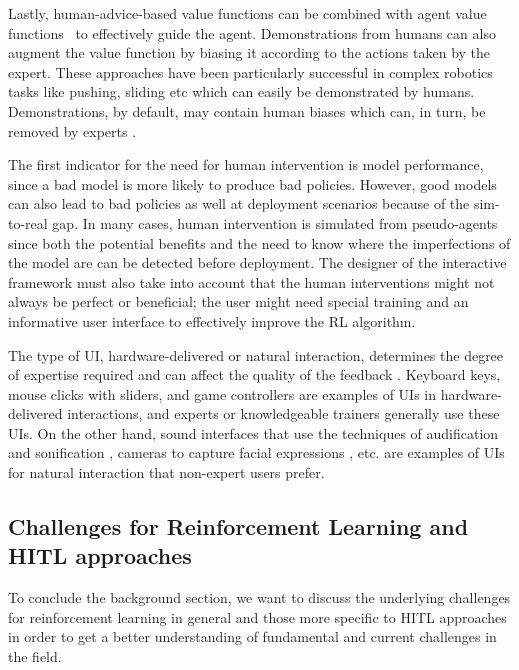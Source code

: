 \documentclass[twoside,11pt]{article}
\begin{document}
\begin{enumerate}
Lastly, human-advice-based value functions can be combined with agent value functions~\citep{jiang:21,kartoun:10, taylor2011integrating, WuEtAl:2021:HITLDRLAutonomousDriving} to effectively guide the agent. Demonstrations \citep{hester2018deep,vecerik2017leveraging,nair2018overcoming} from humans can also augment the value function by biasing it according to the  actions taken by the expert. These approaches have been particularly successful in complex robotics tasks like pushing, sliding etc which can easily be demonstrated by humans.  Demonstrations, by default, may contain human biases which can, in turn, be removed by experts \citep{Wang:2022:SkillPreferences}.

The first indicator for the need for human intervention is model performance, since a bad model is more likely to produce bad policies. However, good models can also lead to bad policies as well at deployment scenarios because of the sim-to-real gap. In many cases, human intervention is simulated from pseudo-agents since both the potential benefits and the need to know where the imperfections of the model are can be detected before deployment. The designer of the interactive framework must also take into account that the human interventions might not always be perfect or beneficial; the user might need special training and an informative user interface to effectively improve the RL algorithm. 

The type of UI, hardware-delivered or natural interaction,  determines the degree of expertise required and can affect the quality of the feedback \citep{lin:20}. Keyboard keys, mouse clicks with sliders, and game controllers are examples of UIs in hardware-delivered interactions, and experts or knowledgeable trainers generally use these UIs. On the other hand, sound interfaces that use the techniques of audification and sonification \citep{Hermann:2011:Sonification,kartoun:10, Saranti:2009,Scurto:2021:DesigningDeepRLHumanParameterExploration}, cameras to capture facial expressions \citep{arakawa:18}, etc. are examples of UIs for natural interaction that non-expert users prefer. 

\subsection{Challenges for Reinforcement Learning and HITL approaches} 
\label{sec:ChallengesRL}

To conclude the background section, we want to discuss the underlying challenges for reinforcement learning in general and those more specific to HITL approaches in order to get a better understanding of fundamental and current challenges in the field.


\end{enumerate}
\end{document}
